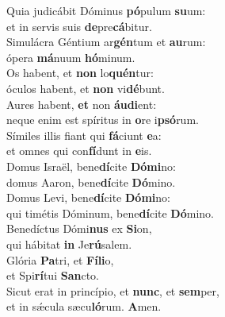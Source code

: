 \evenverse Quia judicábit Dóminus \textbf{pó}pulum \textbf{su}um:~\*\\
\evenverse et in servis suis \textbf{de}pre\textbf{cá}bitur.\\
\oddverse Simulácra Géntium ar\textbf{gén}tum et \textbf{au}rum:~\*\\
\oddverse ópera \textbf{má}nuum \textbf{hó}minum.\\
\evenverse Os habent, et \textbf{non} lo\textbf{quén}tur:~\*\\
\evenverse óculos habent, et \textbf{non} vi\textbf{dé}bunt.\\
\oddverse Aures habent, \textbf{et} non \textbf{áu}\textbf{di}ent:~\*\\
\oddverse neque enim est spíritus in \textbf{o}re i\textbf{psó}rum.\\
\evenverse Símiles illis fiant qui \textbf{fá}ciunt \textbf{e}a:~\*\\
\evenverse et omnes qui con\textbf{fí}dunt in \textbf{e}is.\\
\oddverse Domus Israël, bene\textbf{dí}cite \textbf{Dó}\textbf{mi}no:~\*\\
\oddverse domus Aaron, bene\textbf{dí}cite \textbf{Dó}mino.\\
\evenverse Domus Levi, bene\textbf{dí}cite \textbf{Dó}\textbf{mi}no:~\*\\
\evenverse qui timétis Dóminum, bene\textbf{dí}cite \textbf{Dó}mino.\\
\oddverse Benedíctus Dómi\textbf{nus} ex \textbf{Si}on,~\*\\
\oddverse qui hábitat \textbf{in} Je\textbf{rú}salem.\\
\evenverse Glória \textbf{Pa}tri, et \textbf{Fí}\textbf{li}o,~\*\\
\evenverse et Spi\textbf{rí}tui \textbf{San}cto.\\
\oddverse Sicut erat in princípio, et \textbf{nunc}, et \textbf{sem}per,~\*\\
\oddverse et in sǽcula sæcu\textbf{ló}rum. \textbf{A}men.\\
